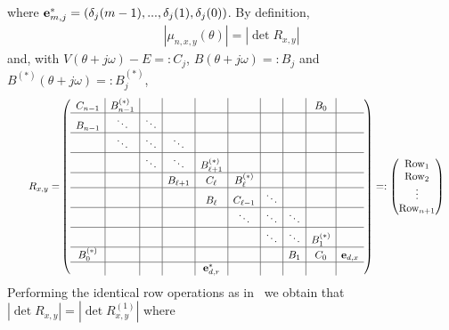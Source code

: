 \documentclass[11pt]{amsart}
\begin{document}
where ${\bf e}_{m,j}^*=(\delta_j(m-1),...,\delta_j(1),\delta_j(0))$. 
By definition, 
\begin{align}\label{eq:muxy=Rxy}
|\mu_{n,x,y}(\theta)|= |\det R_{x,y}|
\end{align}
and, with $V(\theta+j\omega)-E=:C_j$, $B(\theta+j\omega)=:B_j$ and $B^{(*)}(\theta+j\omega)=:B_j^{(*)}$,
\begin{align}\label{eq:Rxy}
\qquad
R_{x,y}
=
&\left(\begin{array}{c|c|c|c|c|c|c|c|c|c}
C_{n-1} & B_{n-1}^{(*)} & & &  & & & &B_0 &\\
\hline
B_{n-1} &\ddots &\ddots & & & & & & & \\
\hline
&\ddots &\ddots &\ddots & & & & & &\\
\hline
& &\ddots &\ddots &B_{\ell+1}^{(*)} & & & & &\\
\hline
& & & B_{\ell+1} &C_{\ell} &B_\ell^{(*)} & & & &\\
\hline
& & & &B_\ell &C_{\ell-1} &\ddots & & &\\
\hline
& & & & &\ddots &\ddots &\ddots & &\\
\hline
& & & & & &\ddots &\ddots &B_1^{(*)} &\\
\hline
B_0^{(*)}& & & & & & &B_1 &C_0 &{\bf e}_{d,x}\\
\hline
& & & &{\bf e}_{d,r}^* & & & & &
\end{array}\right)
=:
\left(\begin{matrix}
\mathrm{Row}_1\\
\mathrm{Row}_2\\
\vdots\\
\text{Row}_{n+1}
\end{matrix}\right)
\end{align}
Performing the identical row operations as in~\cite{HS3} we obtain that $|\det R_{x,y}|=|\det R^{(1)}_{x,y}|$ where
\end{document}
